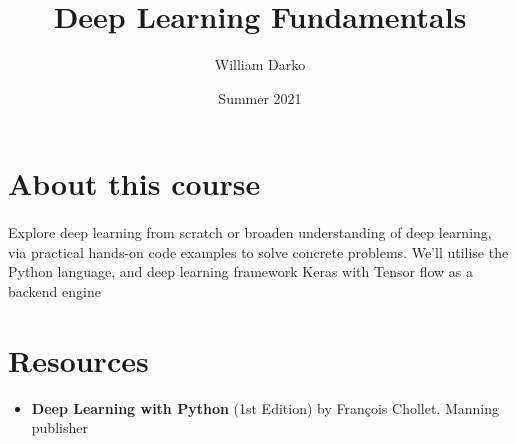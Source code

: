 \documentclass[12pt, a4paper]{article}
\title{Deep Learning Fundamentals}
\author{William Darko}
\date{Summer 2021}
\begin{document}
\maketitle
\newpage

\tableofcontents

\newpage

\section{About this course}
\paragraph*{}
Explore deep learning from scratch or broaden understanding of deep learning, via
practical hands-on code examples to solve concrete problems. We'll
utilise the Python language, and deep learning framework Keras with Tensor flow as a backend engine



\newpage

\section{Resources}

\begin{itemize}
   \item \textbf{Deep Learning with Python} (1st Edition) by François Chollet.
   Manning publisher
\end{itemize}

\newpage
\end{document}

